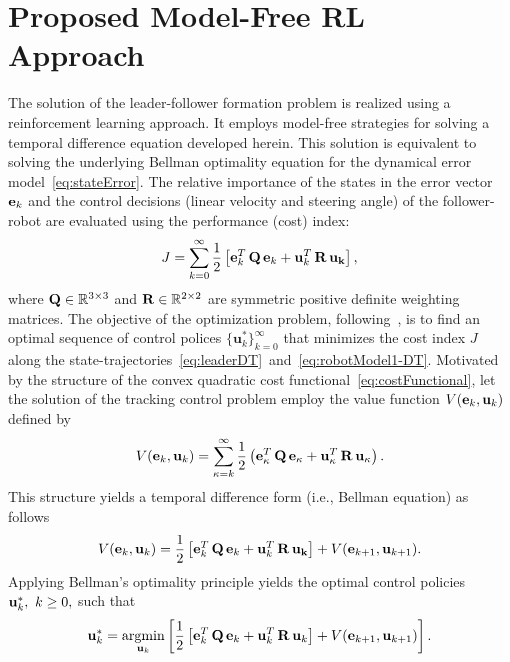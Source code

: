 \documentclass[conference]{IEEEtran}
\DeclareMathOperator*{\argmin}{arg min}
\begin{document}
\section{Proposed Model-Free RL Approach}
\label{sec:RLSolution}

The solution of the leader-follower formation problem is realized using a reinforcement learning approach. It employs model-free strategies for solving a temporal difference equation developed herein. This solution is equivalent to solving the underlying Bellman optimality equation for  the dynamical error model~\eqref{eq:stateError}. The relative importance of the states in the error vector ${\bf e}_k$ and the control decisions (linear velocity and steering angle) of the follower-robot are evaluated using the  performance (cost) index: %
\begin{align}
\label{eq:costFunctional}
J = \sum_{k=0}^\infty \frac{1}{2}\left[{\bf e}_k^T \, {\bf Q} \, {\bf e}_k + {\bf u}_k^T \, {\bf R} \, {\bf u_k}\right],
\end{align}    
where ${\bf Q}\in\mathbb{R}^{3\times 3}$ and ${\bf R}\in\mathbb{R}^{2\times 2}$ are symmetric positive definite weighting matrices. The objective of the optimization problem, following~\cite{Lewis2013-Reinforcement}, is to find an optimal sequence of control polices $\{\mathbf{u}^*_k\}_{k=0}^\infty$ that minimizes the cost index $J$ along the state-trajectories~\eqref{eq:leaderDT}~and~\eqref{eq:robotModel1-DT}. Motivated by the structure of the convex quadratic cost functional~\eqref{eq:costFunctional}, let the solution of the tracking control problem employ the value function $V({\bf e}_k,{\bf u}_k)$ defined by %
%
\begin{equation*}
\label{eq:valueFunction}
V({\bf e}_k,{\bf u}_k) = \sum_{\kappa=k}^\infty \frac{1}{2}\left({\bf e}_\kappa^T\, {\bf Q}\, {\bf e}_\kappa + {\bf u}_\kappa^T \, {\bf R}\, {\bf u_\kappa}\right).
\end{equation*}
%
This structure yields a temporal difference form (i.e., Bellman equation) as follows
\begin{equation*}
\label{eq:tempraldiffeq}
V({\bf e}_k,{\bf u}_k)= \frac{1}{2}\left[{\bf e}_k^T\, {\bf Q}\, {\bf e}_k + {\bf u}_k^T\, {\bf R}\, {\bf u_k}\right] +V({\bf e}_{k+1},{\bf u}_{k+1}).
\end{equation*}
%
Applying Bellman's optimality principle yields the optimal control policies ${\bf u}_k^*,~k\ge 0,$ such that~\cite{Lewis2012} %
%
\begin{align*}
{\bf u}^*_k = \argmin_{{\bf u}_k}\left[\frac{1}{2}\left[{\bf e}^T_k\,  {\bf Q}\, {\bf e}_k +{\bf u}^T_k\,  {\bf R} \,  {\bf u}_k\right]   +
V({\bf e}_{k+1},{\bf u}_{k+1})\right].
\label{eq:argMinControlAction}
\end{align*}
\end{document}
